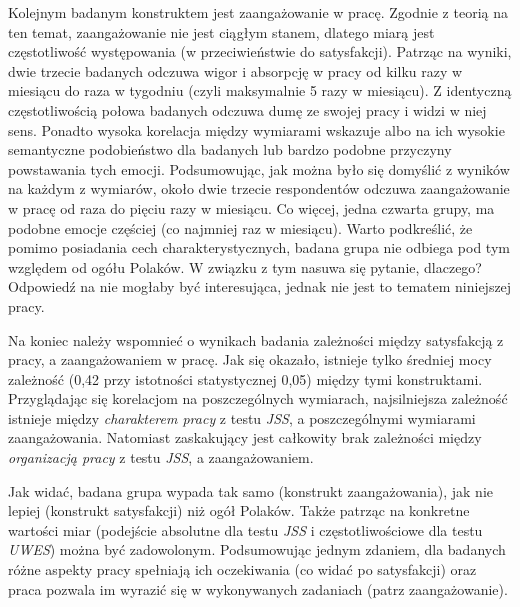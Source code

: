 Kolejnym badanym konstruktem jest zaangażowanie w pracę. Zgodnie z teorią na ten temat, zaangażowanie nie jest ciągłym stanem, dlatego miarą jest częstotliwość występowania (w przeciwieństwie do satysfakcji). Patrząc na wyniki, dwie trzecie badanych odczuwa wigor i absorpcję w pracy od kilku razy w miesiącu do raza w tygodniu (czyli maksymalnie 5 razy w miesiącu). Z identyczną częstotliwością połowa badanych odczuwa dumę ze swojej pracy i widzi w niej sens. Ponadto wysoka korelacja między wymiarami wskazuje albo na ich wysokie semantyczne podobieństwo dla badanych lub bardzo podobne przyczyny powstawania tych emocji. Podsumowując, jak można było się domyślić z wyników na każdym z wymiarów, około dwie
trzecie respondentów odczuwa zaangażowanie w pracę od raza do pięciu razy w miesiącu. Co więcej, jedna czwarta grupy, ma podobne emocje częściej (co najmniej raz w miesiącu). Warto podkreślić, że pomimo posiadania cech charakterystycznych, badana grupa nie odbiega pod tym względem od ogółu Polaków. W związku z tym nasuwa się pytanie, dlaczego? Odpowiedź na nie mogłaby być interesująca, jednak nie jest to tematem niniejszej pracy. 

Na koniec należy wspomnieć o wynikach badania zależności między satysfakcją z pracy, a zaangażowaniem w pracę. Jak się okazało, istnieje tylko średniej mocy zależność (0,42 przy istotności statystycznej 0,05) między tymi konstruktami. Przyglądając się korelacjom na poszczególnych wymiarach, najsilniejsza zależność istnieje między \textit{charakterem pracy} z testu \emph{JSS}, a poszczególnymi wymiarami zaangażowania. Natomiast zaskakujący jest całkowity brak zależności między
\textit{organizacją pracy} z testu \emph{JSS}, a zaangażowaniem.

  Jak widać, badana grupa wypada tak samo (konstrukt zaangażowania), jak nie lepiej (konstrukt satysfakcji) niż ogół Polaków. Także patrząc na konkretne wartości miar (podejście absolutne dla testu \emph{JSS} i częstotliwościowe dla testu \emph{UWES}) można być zadowolonym. Podsumowując jednym zdaniem, dla badanych różne aspekty pracy spełniają ich oczekiwania (co widać po satysfakcji) oraz praca pozwala im wyrazić się w wykonywanych zadaniach (patrz zaangażowanie).
